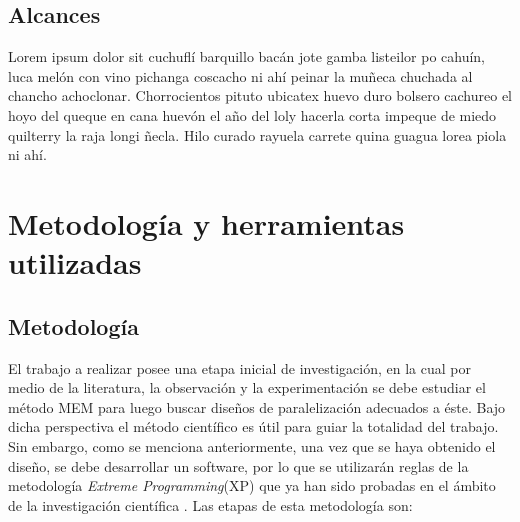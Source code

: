 \subsection{Alcances}
Lorem ipsum dolor sit cuchufl\'i barquillo bac\'an jote gamba listeilor po cahu\'in, luca mel\'on con vino pichanga coscacho ni ah\'i peinar la muñeca chuchada al chancho achoclonar. Chorrocientos pituto ubicatex huevo duro bolsero cachureo el hoyo del queque en cana huev\'on el año del loly hacerla corta impeque de miedo quilterry la raja longi ñecla. Hilo curado rayuela carrete quina guagua lorea piola ni ah\'i.


\section{Metodolog\'ia y herramientas utilizadas}
\label{intro:metodologia}

\subsection{Metodolog\'ia}
El trabajo a realizar posee una etapa inicial de investigación, en la cual por medio de la literatura, la observación y la experimentación se debe estudiar el método MEM  para luego buscar diseños de paralelización adecuados a éste. Bajo dicha perspectiva el método científico es útil para guiar la totalidad del trabajo. Sin embargo, como se menciona anteriormente, una vez que se haya obtenido el diseño, se debe desarrollar un software, por lo que se utilizarán reglas de la metodología \textit{Extreme Programming}(XP) que ya han sido probadas en el ámbito de la investigación científica \cite{xp}. Las etapas de esta metodología son:

